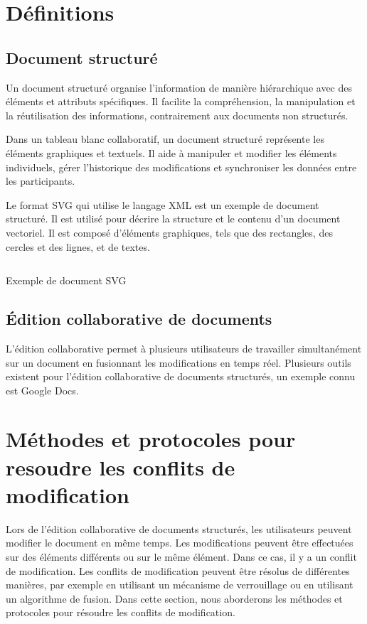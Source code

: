 \section{Définitions}
\subsection{Document structuré}
Un document structuré organise l'information de manière hiérarchique avec des éléments et attributs spécifiques. Il facilite la compréhension, la manipulation et la réutilisation des informations, contrairement aux documents non structurés.

Dans un tableau blanc collaboratif, un document structuré représente les éléments graphiques et textuels. Il aide à manipuler et modifier les éléments individuels, gérer l'historique des modifications et synchroniser les données entre les participants.

Le format SVG qui utilise le langage XML est un exemple de document structuré. Il est utilisé pour décrire la structure et le contenu d'un document vectoriel. Il est composé d'éléments graphiques, tels que des rectangles, des cercles et des lignes, et de textes.

\begin{listing}[H]
    \inputminted{XML}{assets/code/svg-example.svg}
    \caption{Exemple de document SVG \label{fig:svg-example}}
\end{listing}

\subsection{Édition collaborative de documents}
L'édition collaborative permet à plusieurs utilisateurs de travailler simultanément sur un document en fusionnant les modifications en temps réel.
Plusieurs outils existent pour l'édition collaborative de documents structurés, un exemple connu est Google Docs.

\section{Méthodes et protocoles pour resoudre les conflits de modification}
Lors de l'édition collaborative de documents structurés, les utilisateurs peuvent modifier le document en même temps. Les modifications peuvent être effectuées sur des éléments différents ou sur le même élément. Dans ce cas, il y a un conflit de modification. Les conflits de modification peuvent être résolus de différentes manières, par exemple en utilisant un mécanisme de verrouillage ou en utilisant un algorithme de fusion. Dans cette section, nous aborderons les méthodes et protocoles pour résoudre les conflits de modification.


